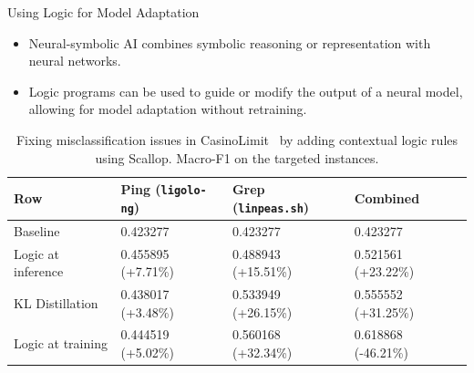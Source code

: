 \begin{frame}{Using Logic for Model Adaptation}
  \begin{itemize}[<+->]
    \item Neural-symbolic AI combines symbolic reasoning or representation with neural networks.
    \item Logic programs can be used to guide or modify the output of a neural model, allowing for \alert{model adaptation} without retraining.
  \end{itemize}

  \onslide<+->
  \begin{table}
    \centering
    \caption{Fixing misclassification issues in CasinoLimit~\autocite{kilian_CasinoLimitOffensiveDataset_2025} by adding contextual logic rules using Scallop.
    Macro-F1 on the targeted instances.}
    \small
    \begin{tabular}{llll}
      \toprule
      \textbf{Row} & \textbf{Ping (\texttt{ligolo-ng})} & \textbf{Grep (\texttt{linpeas.sh})} & \textbf{Combined} \\
      \midrule
      Baseline & 0.423277 & 0.423277 & 0.423277 \\
      Logic at inference & 0.455895 (+7.71\%) & 0.488943 (+15.51\%) & 0.521561 (+23.22\%) \\
      KL Distillation & 0.438017 (+3.48\%) & 0.533949 (+26.15\%) & 0.555552 (+31.25\%) \\
      Logic at training & 0.444519 (+5.02\%) & 0.560168 (+32.34\%) & 0.618868 (-46.21\%) \\
      \bottomrule
    \end{tabular}
  \end{table}

\end{frame}

